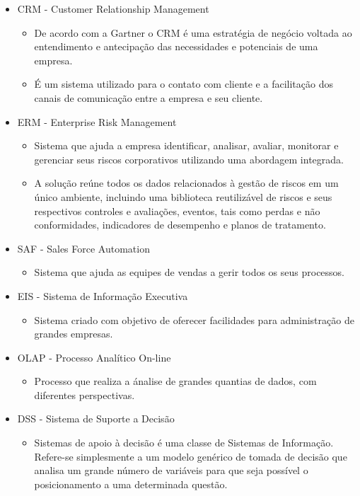 \documentclass[
	12pt,				%
	openany,			%
	a4paper,			%
	chapter=TITLE,		%
	section=TITLE,		%
	english,
	brazil				%
]{abntex2}
\begin{document}
\begin{itemize}
\item CRM - Customer Relationship Management
	\begin{itemize}
		\item[] De acordo com a Gartner o CRM é uma estratégia de negócio voltada ao entendimento e antecipação das necessidades e potenciais de uma empresa.
		\item[] É um sistema utilizado para o contato com cliente e a facilitação dos canais de comunicação entre a empresa e seu cliente.
	\end{itemize}

\item ERM - Enterprise Risk Management
	\begin{itemize}
		\item[] Sistema que ajuda a empresa identificar, analisar, avaliar, monitorar e gerenciar seus riscos corporativos utilizando uma abordagem integrada.
		\item[] A solução reúne todos os dados relacionados à gestão de riscos em um único ambiente, incluindo uma biblioteca reutilizável de riscos e seus respectivos controles e avaliações, eventos, tais como perdas e não conformidades, indicadores de desempenho e planos de tratamento.
	\end{itemize}

\item SAF - Sales Force Automation
	\begin{itemize}
		\item[] Sistema que ajuda as equipes de vendas a gerir todos os seus processos.
	\end{itemize}

\item EIS - Sistema de Informação Executiva
	\begin{itemize}
		\item[] Sistema criado com objetivo de oferecer facilidades para administração de grandes empresas.
	\end{itemize}


\item OLAP - Processo Analítico On-line
	\begin{itemize}
		\item[] Processo que realiza a ánalise de grandes quantias de dados, com diferentes perspectivas.
	\end{itemize}

\item DSS - Sistema de Suporte a Decisão
	\begin{itemize}
		\item[] Sistemas de apoio à decisão é uma classe de Sistemas de Informação. Refere-se simplesmente a um modelo genérico de tomada de decisão que analisa um grande número de variáveis para que seja possível o posicionamento a uma determinada questão.
	\end{itemize}


\end{itemize}
\end{document}
